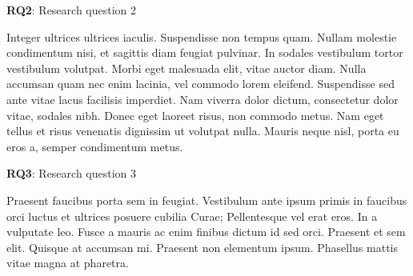 \begin{multicols}{2}
\begin{description}
\item \textbf{RQ2}: Research question 2
\end{description}

Integer ultrices ultrices iaculis. Suspendisse non tempus quam. Nullam molestie condimentum nisi, et sagittis diam feugiat pulvinar. In sodales vestibulum tortor vestibulum volutpat. Morbi eget malesuada elit, vitae auctor diam. Nulla accumsan quam nec enim lacinia, vel commodo lorem eleifend. Suspendisse sed ante vitae lacus facilisis imperdiet. Nam viverra dolor dictum, consectetur dolor vitae, sodales nibh. Donec eget laoreet risus, non commodo metus. Nam eget tellus et risus venenatis dignissim ut volutpat nulla. Mauris neque nisl, porta eu eros a, semper condimentum metus.

\begin{description}
\item \textbf{RQ3}: Research question 3
\end{description}

Praesent faucibus porta sem in feugiat. Vestibulum ante ipsum primis in faucibus orci luctus et ultrices posuere cubilia Curae; Pellentesque vel erat eros. In a vulputate leo. Fusce a mauris ac enim finibus dictum id sed orci. Praesent et sem elit. Quisque at accumsan mi. Praesent non elementum ipsum. Phasellus mattis vitae magna at pharetra.



\bigskip
\smallskip






\end{multicols}
